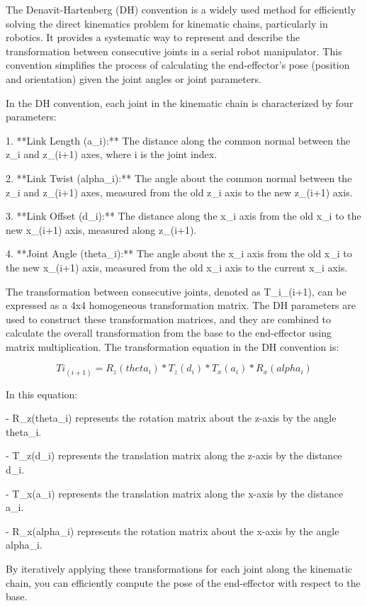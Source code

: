 The Denavit-Hartenberg (DH) convention is a widely used method for efficiently solving the direct kinematics problem for kinematic chains, particularly in robotics. It provides a systematic way to represent and describe the transformation between consecutive joints in a serial robot manipulator. This convention simplifies the process of calculating the end-effector's pose (position and orientation) given the joint angles or joint parameters.

In the DH convention, each joint in the kinematic chain is characterized by four parameters:

1. **Link Length (a\_i):** The distance along the common normal between the z\_i and z\_(i+1) axes, where i is the joint index.

2. **Link Twist (alpha\_i):** The angle about the common normal between the z\_i and z\_(i+1) axes, measured from the old z\_i axis to the new z\_(i+1) axis.

3. **Link Offset (d\_i):** The distance along the x\_i axis from the old x\_i to the new x\_(i+1) axis, measured along z\_(i+1).

4. **Joint Angle (theta\_i):** The angle about the x\_i axis from the old x\_i to the new x\_(i+1) axis, measured from the old x\_i axis to the current x\_i axis.

The transformation between consecutive joints, denoted as T\_i\_(i+1), can be expressed as a 4x4 homogeneous transformation matrix. The DH parameters are used to construct these transformation matrices, and they are combined to calculate the overall transformation from the base to the end-effector using matrix multiplication. The transformation equation in the DH convention is:

$$ Ti_(i+1) = R_z(theta_i) * T_z(d_i) * T_x(a_i) * R_x(alpha_i) $$

In this equation:

- R\_z(theta\_i) represents the rotation matrix about the z-axis by the angle theta\_i.

- T\_z(d\_i) represents the translation matrix along the z-axis by the distance d\_i.

- T\_x(a\_i) represents the translation matrix along the x-axis by the distance a\_i.

- R\_x(alpha\_i) represents the rotation matrix about the x-axis by the angle alpha\_i.

By iteratively applying these transformations for each joint along the kinematic chain, you can efficiently compute the pose of the end-effector with respect to the base.

